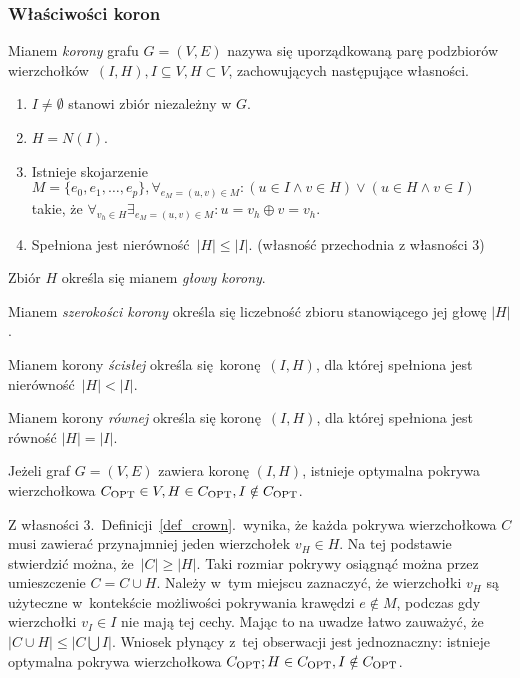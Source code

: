 \subsubsection{\textbf{Właściwości koron}}
\label{sss_kernelization_crown_main}
\begin{definition}
  Mianem \emph{korony} grafu $G=(V, E)$ nazywa się uporządkowaną parę
  podzbiorów wierzchołków $(I, H), I \subseteq V, H \subset V$, zachowujących
  następujące własności.
  \begin{enumerate}
    \item $I \neq \emptyset$ stanowi zbiór niezależny w $G$.
    \item $H=N(I)$.
    \item Istnieje skojarzenie $M=\{e_0, e_1, \ldots, e_p\}, \forall_{e_M=(u,v) \in
      M}: (u\in I \land v\in H) \lor (u \in H \land v \in I)$ takie, że
      $\forall_{v_h \in H}\exists_{e_M=(u,v)\in M}: u = v_h \oplus v = v_h$.
    \item Spełniona jest nierówność $|H| \leq |I|$. (własność przechodnia z własności 3)
  \end{enumerate}
\end{definition}
\begin{definition}
  Zbiór $H$ określa się mianem \emph{głowy korony}.
\end{definition}
\begin{definition}
  Mianem \emph{szerokości korony} określa się liczebność zbioru stanowiącego jej głowę $|H|$.
\end{definition}
\begin{definition}
  Mianem korony \emph{ścisłej} określa się koronę $(I, H)$, dla której spełniona jest nierówność $|H| < |I|$.
\end{definition}
\begin{definition}
  Mianem korony \emph{równej} określa się koronę $(I, H)$, dla której spełniona jest równość $|H| = |I|$.
\end{definition}
\begin{theorem}
  Jeżeli graf $G=(V,E)$ zawiera koronę $(I,H)$, istnieje optymalna pokrywa 
  wierzchołkowa $C_{\textnormal{OPT}} \in V, H \in C_{\textnormal{OPT}}, I \notin C_{\textnormal{OPT}}$.
\end{theorem}
\begin{bproof}
  Z własności 3.\ Definicji~\ref{def_crown}.\ wynika, że każda pokrywa 
  wierzchołkowa $C$ musi zawierać przynajmniej jeden wierzchołek $v_H \in H$.
  Na tej podstawie stwierdzić można, że $|C|\geq|H|$.
  Taki rozmiar pokrywy osiągnąć można przez umieszczenie $C=C\cup H$.
  Należy w~tym miejscu zaznaczyć, że wierzchołki $v_H$ są użyteczne w~kontekście
  możliwości pokrywania krawędzi $e \notin M$, podczas gdy wierzchołki $v_I \in
  I$ nie mają tej cechy.
  Mając to na uwadze łatwo zauważyć, że $|C \cup H| \leq |C \bigcup
  I|$.
  Wniosek płynący z~tej obserwacji jest jednoznaczny: istnieje optymalna pokrywa
  wierzchołkowa $C_{\textnormal{OPT}}; H \in C_{\textnormal{OPT}}, I \notin C_{\textnormal{OPT}}$.
\end{bproof}
